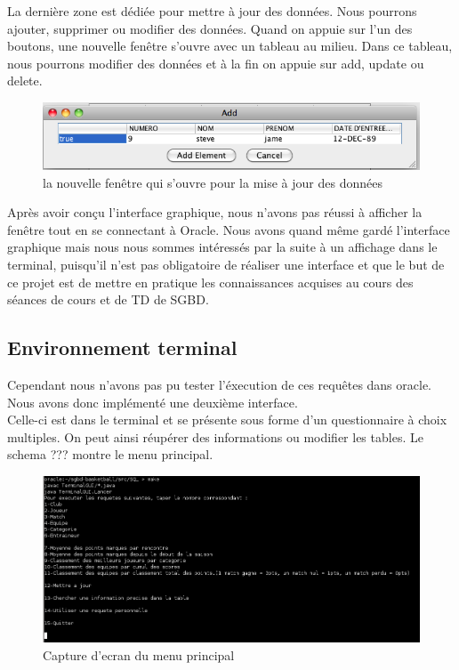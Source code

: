 \documentclass{article}
\begin{document}
La dernière zone est dédiée pour mettre à jour des données. Nous pourrons ajouter, supprimer ou modifier des données. Quand on appuie sur l'un des boutons, une nouvelle fenêtre s'ouvre avec un tableau au milieu. Dans ce tableau, nous pourrons modifier des données et à la fin on appuie sur add, update ou delete. \\


\begin{figure}[!h]
\centering
\includegraphics[scale = 0.4] {4.png}
\caption{la nouvelle fenêtre qui s'ouvre pour la mise à jour des données}
\end{figure}


Après avoir conçu l'interface graphique, nous n'avons pas réussi à afficher la fenêtre tout en se connectant à Oracle. Nous avons quand même gardé l'interface graphique mais nous nous sommes intéressés par la suite à un affichage dans le terminal, puisqu'il n'est pas obligatoire de réaliser une interface et que le but de ce projet est de mettre en pratique les connaissances acquises au cours des séances de cours et de TD de SGBD. 

\subsection{Environnement terminal}

Cependant nous n'avons pas pu tester l'éxecution de ces requêtes dans oracle. Nous avons donc implémenté une deuxième interface.\\
Celle-ci est dans le terminal et se présente sous forme d'un questionnaire à choix multiples. On peut ainsi réupérer des informations ou modifier les tables. Le schema ??? montre le menu principal.\\
\begin{figure}[h!]
\begin{narrow}{-0.3in}{0in}
\includegraphics[scale = 0.3]{TerGUI.png}
\caption{Capture d'ecran du menu principal}
\end{narrow}
\end{figure}
\end{document}
